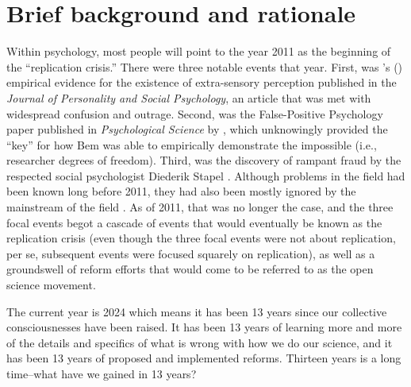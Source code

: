 \documentclass[authordate, empirical]{jote-new-article}
\begin{document}
\section{Brief background and rationale}







Within psychology, most people will point to the year 2011 as the beginning of the “replication crisis.” There were three notable events that year. First, was \citeauthor{Bem2011}'s (\hspace*{-2pt}\citeyear{Bem2011}) empirical evidence for the existence of extra-sensory perception published in the \emph{Journal of Personality and Social Psychology}, an article that was met with widespread confusion and outrage. Second, was the False-Positive Psychology paper published in \emph{Psychological Science} by \textcite{Simmons2011}, which unknowingly provided the “key” for how Bem was able to empirically demonstrate the impossible (i.e., researcher degrees of freedom). Third, was the discovery of rampant fraud by the respected social psychologist Diederik Stapel \parencites{Wicherts2011}. Although problems in the field had been known long before 2011, they had also been mostly ignored by the mainstream of the field \parencites[see][for several examples]{Syed2019}. As of 2011, that was no longer the case, and the three focal events begot a cascade of events that would eventually be known as the replication crisis (even though the three focal events were not about replication, per se, subsequent events were focused squarely on replication), as well as a groundswell of reform efforts that would come to be referred to as the open science movement.







The current year is 2024 which means it has been 13 years since our collective consciousnesses have been raised. It has been 13 years of learning more and more of the details and specifics of what is wrong with how we do our science, and it has been 13 years of proposed and implemented reforms. Thirteen years is a long time--what have we gained in 13 years?
\end{document}
